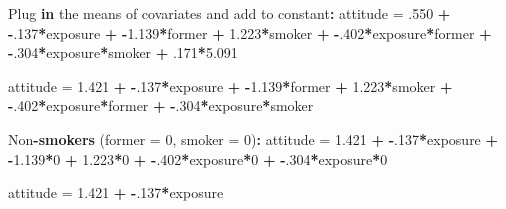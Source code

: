 \documentclass[a4paper]{book}
\newenvironment{Shaded}{\begin{snugshade}}{\end{snugshade}}
\newcommand{\KeywordTok}[1]{\textcolor[rgb]{0,0,0}{\textbf{#1}}}
\newcommand{\DataTypeTok}[1]{\textcolor[rgb]{0,0,0}{#1}}
\newcommand{\DecValTok}[1]{\textcolor[rgb]{0.00,0.00,0.00}{#1}}
\newcommand{\FloatTok}[1]{\textcolor[rgb]{0.00,0.00,0.00}{#1}}
\newcommand{\StringTok}[1]{\textcolor[rgb]{0.00,0.00,0.00}{#1}}
\newcommand{\ControlFlowTok}[1]{\textcolor[rgb]{0.00,0.00,0.00}{\textbf{#1}}}
\newcommand{\OperatorTok}[1]{\textcolor[rgb]{0.00,0.00,0.00}{\textbf{#1}}}
\newcommand{\NormalTok}[1]{#1}
\theoremstyle{definition}
\theoremstyle{definition}
\theoremstyle{definition}
\theoremstyle{remark}
\begin{document}
\begin{Shaded}
\begin{Highlighting}[]
\NormalTok{Plug }\ControlFlowTok{in}\NormalTok{ the means of covariates and add to constant}\OperatorTok{:}\StringTok{  }
\StringTok{    }
\NormalTok{attitude =}\StringTok{ }\NormalTok{.}\DecValTok{550} \OperatorTok{+}\StringTok{ }\OperatorTok{-}\NormalTok{.}\DecValTok{137}\OperatorTok{*}\NormalTok{exposure }\OperatorTok{+}\StringTok{ }\OperatorTok{-}\FloatTok{1.139}\OperatorTok{*}\NormalTok{former }\OperatorTok{+}\StringTok{ }\FloatTok{1.223}\OperatorTok{*}\NormalTok{smoker }\OperatorTok{+}\StringTok{ }
\StringTok{  }\OperatorTok{-}\NormalTok{.}\DecValTok{402}\OperatorTok{*}\NormalTok{exposure}\OperatorTok{*}\NormalTok{former }\OperatorTok{+}\StringTok{ }\OperatorTok{-}\NormalTok{.}\DecValTok{304}\OperatorTok{*}\NormalTok{exposure}\OperatorTok{*}\NormalTok{smoker }\OperatorTok{+}\StringTok{ }\NormalTok{.}\DecValTok{171}\OperatorTok{*}\FloatTok{5.091}  
  
\NormalTok{attitude =}\StringTok{ }\FloatTok{1.421} \OperatorTok{+}\StringTok{ }\OperatorTok{-}\NormalTok{.}\DecValTok{137}\OperatorTok{*}\NormalTok{exposure }\OperatorTok{+}\StringTok{ }\OperatorTok{-}\FloatTok{1.139}\OperatorTok{*}\NormalTok{former }\OperatorTok{+}\StringTok{ }\FloatTok{1.223}\OperatorTok{*}\NormalTok{smoker }\OperatorTok{+}\StringTok{ }
\StringTok{  }\OperatorTok{-}\NormalTok{.}\DecValTok{402}\OperatorTok{*}\NormalTok{exposure}\OperatorTok{*}\NormalTok{former }\OperatorTok{+}\StringTok{ }\OperatorTok{-}\NormalTok{.}\DecValTok{304}\OperatorTok{*}\NormalTok{exposure}\OperatorTok{*}\NormalTok{smoker  }
  
\NormalTok{Non}\OperatorTok{-}\KeywordTok{smokers}\NormalTok{ (}\DataTypeTok{former =} \DecValTok{0}\NormalTok{, }\DataTypeTok{smoker =} \DecValTok{0}\NormalTok{)}\OperatorTok{:}\StringTok{  }
\StringTok{  }
\NormalTok{attitude =}\StringTok{ }\FloatTok{1.421} \OperatorTok{+}\StringTok{ }\OperatorTok{-}\NormalTok{.}\DecValTok{137}\OperatorTok{*}\NormalTok{exposure }\OperatorTok{+}\StringTok{ }\OperatorTok{-}\FloatTok{1.139}\OperatorTok{*}\DecValTok{0} \OperatorTok{+}\StringTok{ }\FloatTok{1.223}\OperatorTok{*}\DecValTok{0} \OperatorTok{+}\StringTok{ }\OperatorTok{-}\NormalTok{.}\DecValTok{402}\OperatorTok{*}\NormalTok{exposure}\OperatorTok{*}\DecValTok{0} \OperatorTok{+}\StringTok{ }
\StringTok{  }\OperatorTok{-}\NormalTok{.}\DecValTok{304}\OperatorTok{*}\NormalTok{exposure}\OperatorTok{*}\DecValTok{0}  
  
\NormalTok{attitude =}\StringTok{ }\FloatTok{1.421} \OperatorTok{+}\StringTok{ }\OperatorTok{-}\NormalTok{.}\DecValTok{137}\OperatorTok{*}\NormalTok{exposure  }
  

\end{Highlighting}
\end{Shaded}
\end{document}
